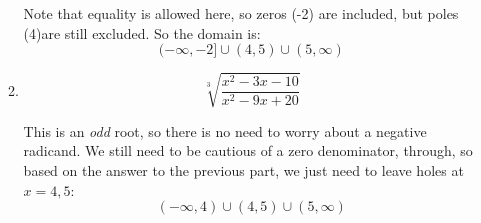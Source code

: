 \documentclass[letterpaper,12pt,fleqn]{article}
\begin{document}
\begin{enumerate}
\begin{enumerate}
    
    \bigskip

    Note that equality is allowed here, so zeros (-2) are included, but poles
    (4)are still excluded. So the domain is:
    \[(-\infty,-2]\cup(4,5)\cup(5,\infty)\]

  \item \[\sqrt[3]{\frac{x^2-3x-10}{x^2-9x+20}}\]
      
  This is an \emph{odd} root, so there is no need to worry about a negative
  radicand. We still need to be cautious of a zero denominator, through, so
  based on the answer to the previous part, we just need to leave holes at
  $x=4,5$:
  \[(-\infty,4)\cup(4,5)\cup(5,\infty)\]
  
  \end{enumerate}
\end{enumerate}
  
\end{document}
